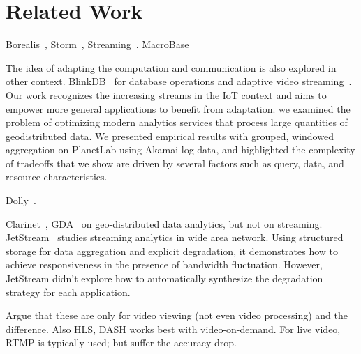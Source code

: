 \section{Related Work}
\label{sec:related-work}

 Borealis~\cite{abadi2005design},
Storm~\cite{toshniwal2014storm}, Streaming~\cite{zaharia2013discretized}.
MacroBase

 The idea of adapting the computation and
communication is also explored in other
context. BlinkDB~\cite{agarwal2013blinkdb} for database operations and adaptive
video streaming~\cite{yin2015control}. Our work recognizes the increasing
streams in the IoT context and aims to empower more general applications to
benefit from adaptation. \cite{heintz2015towards} we examined the problem of
optimizing modern analytics services that process large quantities of
geodistributed data. We presented empirical results with grouped, windowed
aggregation on PlanetLab using Akamai log data, and highlighted the complexity
of tradeoffs that we show are driven by several factors such as query, data, and
resource characteristics.

 Dolly~\cite{ananthanarayanan2013effective}.
\lipsum[1]

 Clarinet~\cite{viswanathan2016clarinet}, GDA~\cite{pu2015low}
on geo-distributed data analytics, but not on
streaming. JetStream~\cite{rabkin2014aggregation} studies streaming analytics in
wide area network. Using structured storage for data aggregation and explicit
degradation, it demonstrates how to achieve responsiveness in the presence of
bandwidth fluctuation. However, JetStream didn't explore how to automatically
synthesize the degradation strategy for each application.

 Argue that these are only for video viewing (not even
video processing) and the difference. Also HLS, DASH works best with
video-on-demand. For live video, RTMP is typically used; but suffer the accuracy
drop.

 \lipsum[1]


